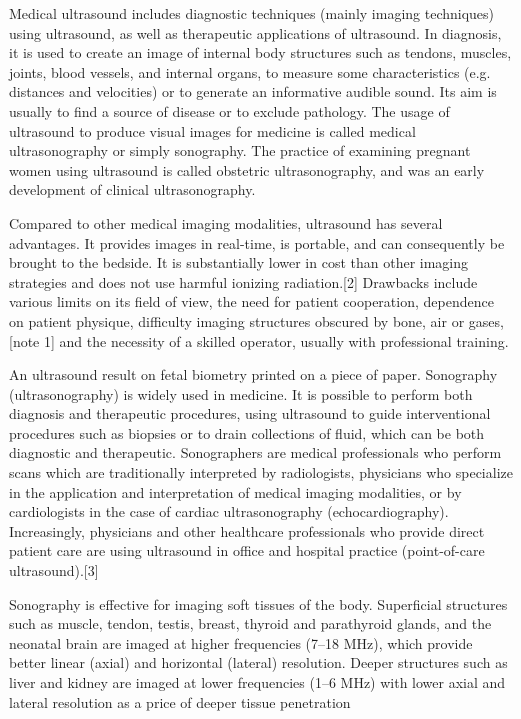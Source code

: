 \documentclass[12pt]{article}
\begin{document}
Medical ultrasound includes diagnostic techniques (mainly imaging techniques) using ultrasound, as well as therapeutic applications of ultrasound. In diagnosis, it is used to create an image of internal body structures such as tendons, muscles, joints, blood vessels, and internal organs, to measure some characteristics (e.g. distances and velocities) or to generate an informative audible sound. Its aim is usually to find a source of disease or to exclude pathology. The usage of ultrasound to produce visual images for medicine is called medical ultrasonography or simply sonography. The practice of examining pregnant women using ultrasound is called obstetric ultrasonography, and was an early development of clinical ultrasonography.
          
          Compared to other medical imaging modalities, ultrasound has several advantages. It provides images in real-time, is portable, and can consequently be brought to the bedside. It is substantially lower in cost than other imaging strategies and does not use harmful ionizing radiation.[2] Drawbacks include various limits on its field of view, the need for patient cooperation, dependence on patient physique, difficulty imaging structures obscured by bone, air or gases,[note 1] and the necessity of a skilled operator, usually with professional training.


An ultrasound result on fetal biometry printed on a piece of paper.
Sonography (ultrasonography) is widely used in medicine. It is possible to perform both diagnosis and therapeutic procedures, using ultrasound to guide interventional procedures such as biopsies or to drain collections of fluid, which can be both diagnostic and therapeutic. Sonographers are medical professionals who perform scans which are traditionally interpreted by radiologists, physicians who specialize in the application and interpretation of medical imaging modalities, or by cardiologists in the case of cardiac ultrasonography (echocardiography). Increasingly, physicians and other healthcare professionals who provide direct patient care are using ultrasound in office and hospital practice (point-of-care ultrasound).[3]

Sonography is effective for imaging soft tissues of the body. Superficial structures such as muscle, tendon, testis, breast, thyroid and parathyroid glands, and the neonatal brain are imaged at higher frequencies (7–18 MHz), which provide better linear (axial) and horizontal (lateral) resolution. Deeper structures such as liver and kidney are imaged at lower frequencies (1–6 MHz) with lower axial and lateral resolution as a price of deeper tissue penetration
\end{document}
